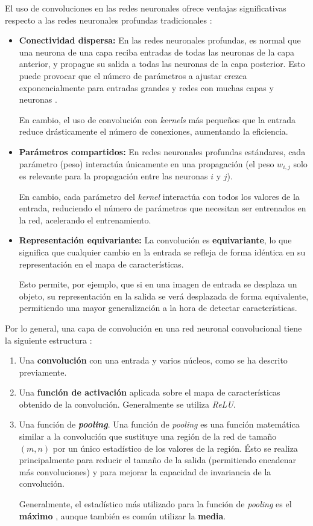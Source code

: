 El uso de convoluciones en las redes neuronales ofrece ventajas significativas  respecto a las redes neuronales profundas tradicionales \cite{Goodfellow-et-al-2016}:
\begin{itemize}
	\item \textbf{Conectividad dispersa:} En las redes neuronales profundas, es normal que una neurona de una capa reciba entradas de todas las neuronas de la capa anterior, y propague su salida a todas las neuronas de la capa posterior. Esto puede provocar que el número de parámetros a ajustar crezca exponencialmente para entradas grandes y redes con muchas capas y neuronas \cite{10.5555/3161223}.
	
	En cambio, el uso de convolución con \textit{kernels} más pequeños que la entrada reduce drásticamente el número de conexiones, aumentando la eficiencia.
	\item \textbf{Parámetros compartidos:} En redes neuronales profundas estándares, cada parámetro (peso) interactúa únicamente en una propagación (el peso $w_{i, j}$ solo es relevante para la propagación entre las neuronas $i$ y $j$).
	
	En cambio, cada parámetro del \textit{kernel} interactúa con todos los valores de la entrada, reduciendo el número de parámetros que necesitan ser entrenados en la red, acelerando el entrenamiento.
	\item \textbf{Representación equivariante:} La convolución es \textbf{equivariante}, lo que significa que cualquier cambio en la entrada se refleja de forma idéntica en su representación en el mapa de características.
	
	Esto permite, por ejemplo, que si en una imagen de entrada se desplaza un objeto, su representación en la salida se verá desplazada de forma equivalente, permitiendo una mayor generalización a la hora de detectar características.
\end{itemize}

Por lo general, una capa de convolución en una red neuronal convolucional tiene la siguiente estructura \cite{Goodfellow-et-al-2016}: 
\begin{enumerate}
	\item Una \textbf{convolución} con una entrada y varios núcleos, como se ha descrito previamente.
	\item Una \textbf{función de activación} aplicada sobre el mapa de características obtenido de la convolución. Generalmente se utiliza \textit{ReLU}.
	\item Una función de \textbf{\textit{pooling}}. Una función de \textit{pooling} es una función matemática similar a la convolución que sustituye una región de la red de tamaño $(m,n)$ por un único estadístico de los valores de la región. Ésto se realiza principalmente para reducir el tamaño de la salida (permitiendo encadenar más convoluciones) y para mejorar la capacidad de invariancia de la convolución.
	
	Generalmente, el estadístico más utilizado para la función de \textit{pooling} es el \textbf{máximo} \cite{Zhou1988ComputationOO}, aunque también es común utilizar la \textbf{media}.
\end{enumerate}

